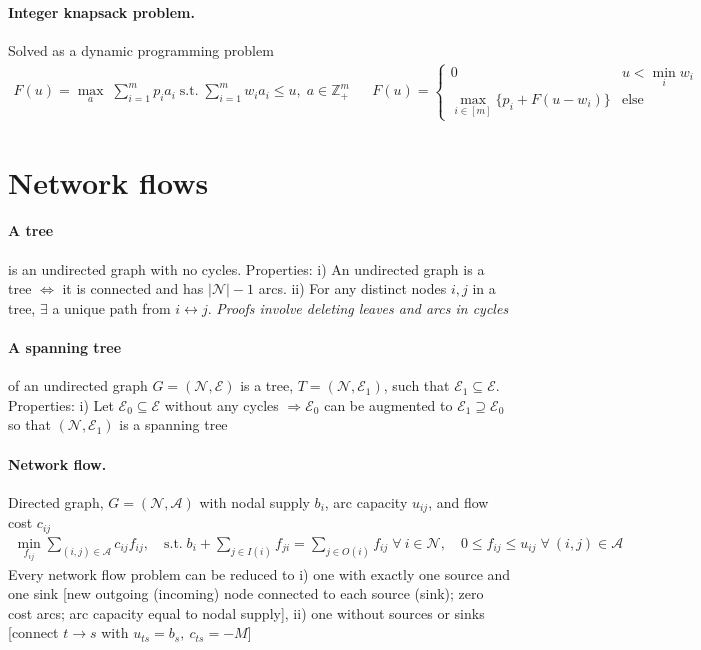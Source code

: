 \documentclass{article}
\begin{document}
\paragraph{Integer knapsack problem.} Solved as a dynamic programming problem
\begin{align*}
    F(u) = \max_a\; \sum_{i=1}^mp_ia_i\;\text{s.t.}\; \sum_{i=1}^mw_ia_i \leq u,\; a \in\mathbb Z_+^m
    &&F(u)=\begin{cases}
        0 & u < \min_iw_i\\
        \max_{i\in[m]}\{p_i + F(u - w_i)\}&\text{else}
    \end{cases}
\end{align*}






\section{Network flows}
\paragraph{A tree} is an undirected graph with no cycles. Properties: i) An undirected graph is a tree $\iff$ it is connected and has $|\mathcal N|-1$ arcs. ii) For any distinct nodes $i,j$ in a tree, $\exists$ a unique path from $i\leftrightarrow j$. \emph{Proofs involve deleting leaves and arcs in cycles}

\paragraph{A spanning tree} of an undirected graph $G=(\mathcal N,\mathcal E)$ is a tree, $T=(\mathcal N, \mathcal E_1)$, such that $\mathcal E_1 \subseteq \mathcal E$. Properties: i) Let $\mathcal E_0\subseteq \mathcal E$ without any cycles $\Longrightarrow \mathcal E_0$ can be augmented to $\mathcal E_1 \supseteq \mathcal E_0$ so that $(\mathcal N, \mathcal E_1)$ is a spanning tree 

\paragraph{Network flow.} Directed graph, $G=(\mathcal N, \mathcal A)$ with nodal supply $b_i$, arc capacity $u_{ij}$, and flow cost $c_{ij}$
\begin{align*}
    \min_{f_{ij}} \sum_{(i,j)\in\mathcal A}c_{ij}f_{ij}, \quad \text{s.t.}\; b_i + \sum_{j\in I(i)}f_{ji} = \sum_{j\in O(i)}f_{ij}\; \forall\ i\in \mathcal N, \quad 0 \leq f_{ij} \leq u_{ij}\;\forall\ (i,j)\in \mathcal A
\end{align*} 
Every network flow problem can be reduced to i) one with exactly one source and one sink [new outgoing (incoming) node connected to each source (sink); zero cost arcs; arc capacity equal to nodal supply], ii) one without sources or sinks [connect $t\rightarrow s$ with $u_{ts}=b_s,\ c_{ts}=-M$]
\end{document}
